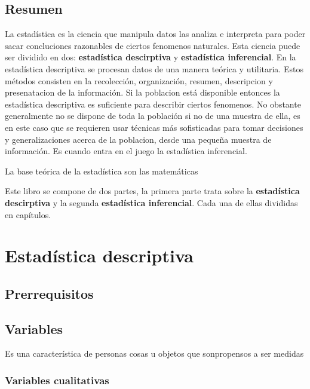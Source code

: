\documentclass[
  10pt,
]{krantz}
\theoremstyle{definition}
\theoremstyle{definition}
\theoremstyle{definition}
\theoremstyle{definition}
\theoremstyle{remark}
\begin{document}
\hypertarget{resumen}{%
\chapter*{Resumen}\label{resumen}}


La estadística es la ciencia que manipula datos las analiza e interpreta para poder sacar concluciones razonables de ciertos fenomenos naturales. Esta ciencia puede ser dividido en dos: \textbf{estadística descirptiva} y \textbf{estadística inferencial}. En la estadística descriptiva se procesan datos de una manera teórica y utilitaria. Estos métodos consisten en la recolección, organización, resumen, descripcion y presenatacion de la información. Si la poblacion está disponible entonces la estadística descriptiva es suficiente para describir ciertos fenomenos. No obstante generalmente no se dispone de toda la población si no de una muestra de ella, es en este caso que se requieren usar técnicas más sofisticadas para tomar decisiones y generalizaciones acerca de la poblacion, desde una pequeña muestra de información. Es cuando entra en el juego la estadística inferencial.

La base teórica de la estadística son las matemáticas

Este libro se compone de dos partes, la primera parte trata sobre la \textbf{estadística descirptiva} y la segunda \textbf{estadística inferencial}. Cada una de ellas divididas en capítulos.

\mainmatter

\hypertarget{part-estaduxedstica-descriptiva}{%
\part{Estadística descriptiva}\label{part-estaduxedstica-descriptiva}}

\hypertarget{prerrequisitos}{%
\chapter{Prerrequisitos}\label{prerrequisitos}}

\hypertarget{variables}{%
\chapter{Variables}\label{variables}}

Es una característica de personas cosas u objetos que sonpropensos a ser medidas

\hypertarget{variables-cualitativas}{%
\section{Variables cualitativas}\label{variables-cualitativas}}
\end{document}
